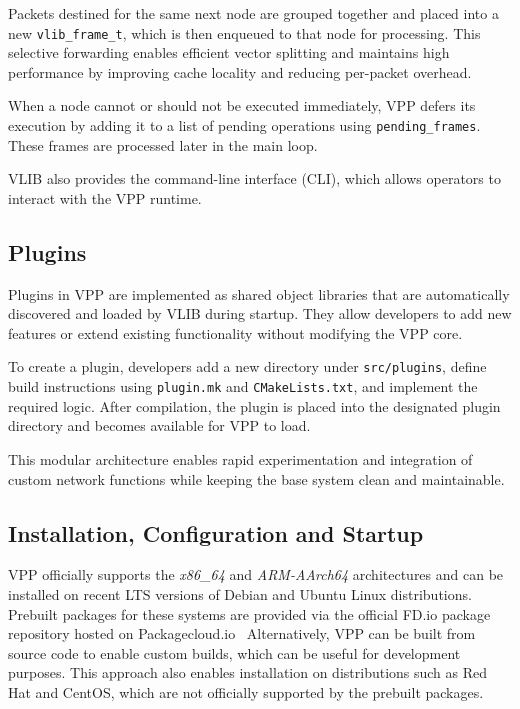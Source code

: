 Packets destined for the same next node are grouped together and placed into a new \texttt{vlib\_frame\_t}, which is then enqueued to that node for processing.
This selective forwarding enables efficient vector splitting and maintains high performance by improving cache locality and reducing per-packet overhead.

When a node cannot or should not be executed immediately, 
VPP defers its execution by adding it to a list of pending operations using \texttt{pending\_frames}.
These frames are processed later in the main loop.

VLIB also provides the command-line interface (CLI), which allows operators to interact with the VPP runtime.~\cite{fdio-vpp-vlib-2506}

\subsection{Plugins}
Plugins in VPP are implemented as shared object libraries that are automatically discovered and loaded by VLIB during startup. 
They allow developers to add new features or extend existing functionality without modifying the VPP core.

To create a plugin, developers add a new directory under \texttt{src/plugins}, define build instructions using \texttt{plugin.mk} and \texttt{CMakeLists.txt}, and implement the required logic. 
After compilation, the plugin is placed into the designated plugin directory and becomes available for VPP to load.

This modular architecture enables rapid experimentation and integration of custom network functions while keeping the base system clean and maintainable.~\cite{fdio-vpp-plugins-2506, fdio-vpp-addplugin-2506}

\subsection{Installation, Configuration and Startup}
VPP officially supports the \textit{x86\_64} and \textit{ARM-AArch64} architectures and can be installed on recent LTS versions of Debian and Ubuntu Linux distributions.~\cite{fdio-supported-2025}
Prebuilt packages for these systems are provided via the official FD.io package repository hosted on Packagecloud.io~\cite{fdio-packagecloud}
Alternatively, VPP can be built from source code to enable custom builds, which can be useful for development purposes.
This approach also enables installation on distributions such as Red Hat and CentOS, which are not officially supported by the prebuilt packages.~\cite{fdio-building-guide}

